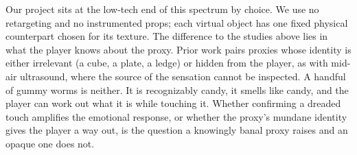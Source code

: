 Our project sits at the low-tech end of this spectrum by choice. We use no retargeting and no instrumented props; each virtual object has one fixed physical counterpart chosen for its texture. The difference to the studies above lies in what the player knows about the proxy. Prior work pairs proxies whose identity is either irrelevant (a cube, a plate, a ledge) or hidden from the player, as with mid-air ultrasound, where the source of the sensation cannot be inspected. A handful of gummy worms is neither. It is recognizably candy, it smells like candy, and the player can work out what it is while touching it. Whether confirming a dreaded touch amplifies the emotional response, or whether the proxy's mundane identity gives the player a way out, is the question a knowingly banal proxy raises and an opaque one does not.

